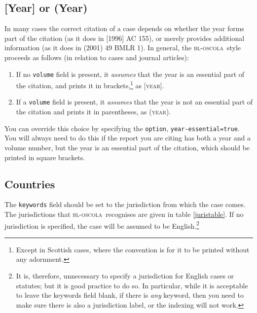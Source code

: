 \documentclass[a5paper,fontsize=9pt,DIV=1]{scrartcl}
\newcommand{\oscola}{\textsc{bl-oscola}}
\begin{document}
\subsection{[Year] or (Year)}

In\label{yearoptional} many cases the correct citation of a case depends on whether the
year forms part of the citation (as it does in [1996] AC 155), or
merely provides additional information (as it does in (2001) 49
BMLR 1). In general, the \oscola\ style proceeds as follows (in
relation to cases and journal articles):
\begin{enumerate}
\item If no \texttt{volume} field is present, it \emph{assumes} that
  the year is an essential part of the citation, and prints it in
  brackets,\footnote{Except in Scottish cases, where the convention is for it to be printed without any adornment.} as [\textsc{year}].
\item If a \texttt{volume} field is present, it \emph{assumes}
  that the year is not an essential part of the citation and prints it
  in parentheses, as (\textsc{year}).
\end{enumerate}

You can override this choice by specifying the \texttt{option},
\texttt{year-essential=true}. You will always need to do this if the
report you are citing has both a year and a volume number, but the
year is an essential part of the citation, which should be printed in square brackets.

\subsection{Countries\label{countries}}

The \texttt{keywords} field should be set to the jurisdiction from
which the case comes. The jurisdictions that \oscola\ recognises are
given in table \ref{juristable}. If no jurisdiction is specified, the
case will be assumed to be English.\footnote{It is, therefore,
  unnecessary to specify a jurisdiction for English cases or statutes;
  but it is good practice to do so. In particular, while it is
  acceptable to leave the keywords field blank, if there is
  \emph{any} keyword, then you need to make sure there is also a
  jurisdiction label, or the indexing will not work.}
\end{document}
